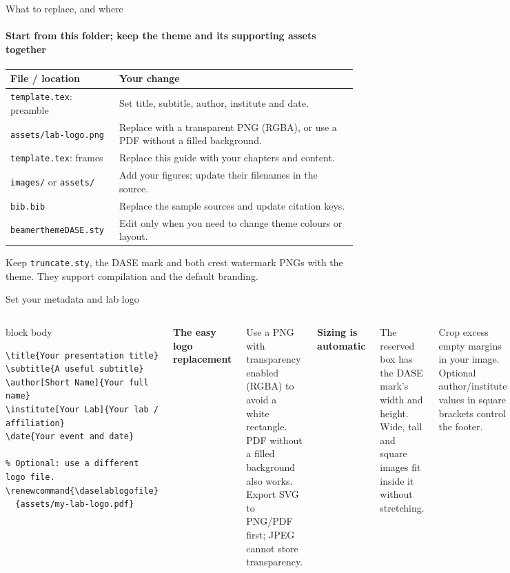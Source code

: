 \documentclass[aspectratio=169,10pt]{beamer}
\begin{document}
\begin{frame}{What to replace, and where}
  \framesubtitle{Start from this folder; keep the theme and its supporting assets together}
  \small
  \begin{tabular}{@{}p{}p{}@{}}
    \toprule
    \textbf{File / location} & \textbf{Your change}\\
    \midrule
    \texttt{template.tex}: preamble & Set title, subtitle, author, institute and date.\\[2mm]
    \texttt{assets/lab-logo.png} & Replace with a transparent PNG (RGBA), or use a PDF without a filled background.\\[2mm]
    \texttt{template.tex}: frames & Replace this guide with your chapters and content.\\[2mm]
    \texttt{images/} or \texttt{assets/} & Add your figures; update their filenames in the source.\\[2mm]
    \texttt{bib.bib} & Replace the sample sources and update citation keys.\\[2mm]
    \texttt{beamerthemeDASE.sty} & Edit only when you need to change theme colours or layout.\\
    \bottomrule
  \end{tabular}
  \vfill
  \textcolor{DASEslate}{\scriptsize Keep \texttt{truncate.sty}, the DASE mark and both crest watermark PNGs with the theme. They support compilation and the default branding.}
\end{frame}

\begin{frame}[fragile]{Set your metadata and lab logo}
  \begin{columns}[T,onlytextwidth]
      \begin{beamercolorbox}[wd=\linewidth,sep=2mm,rounded=true]{block body}
\scriptsize
\begin{Verbatim}
\title{Your presentation title}
\subtitle{A useful subtitle}
\author[Short Name]{Your full name}
\institute[Your Lab]{Your lab / affiliation}
\date{Your event and date}

% Optional: use a different logo file.
\renewcommand{\daselablogofile}
  {assets/my-lab-logo.pdf}
\end{Verbatim}
      \end{beamercolorbox}
      \textbf{The easy logo replacement}\par\smallskip
      \small Use a PNG with transparency enabled (RGBA) to avoid a white rectangle. PDF without a filled background also works. Export SVG to PNG/PDF first; JPEG cannot store transparency.
      \par\medskip
      \textbf{Sizing is automatic}\par\smallskip
      \small The reserved box has the DASE mark's width and height. Wide, tall and square images fit inside it without stretching.
      \par\medskip
      \textcolor{DASEslate}{\scriptsize Crop excess empty margins in your image. Optional author/institute values in square brackets control the footer.}
  \end{columns}
\end{frame}
\end{document}
